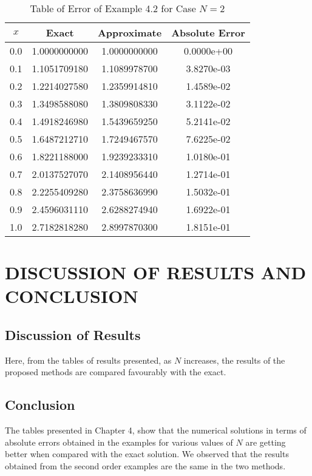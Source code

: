 \documentclass[12pt]{report}
\begin{document}
	\begin{table}[!hbt]
		\caption{Table of Error of Example 4.2 for Case $N=2$}
		\begin{center}
			\begin{tabular}{|c||c||c||c||}
				\hline
				$x$ & Exact & Approximate & Absolute Error\\ \hline
				0.0 & 1.0000000000 & 1.0000000000 & 0.0000e+00\\ \hline
				0.1 & 1.1051709180 & 1.1089978700 & 3.8270e-03\\ \hline
				0.2 & 1.2214027580 & 1.2359914810 & 1.4589e-02\\ \hline
				0.3 & 1.3498588080 & 1.3809808330 & 3.1122e-02\\ \hline
				0.4 & 1.4918246980 & 1.5439659250 & 5.2141e-02\\ \hline
				0.5 & 1.6487212710 & 1.7249467570 & 7.6225e-02\\ \hline
				0.6 & 1.8221188000 & 1.9239233310 & 1.0180e-01\\ \hline
				0.7 & 2.0137527070 & 2.1408956440 & 1.2714e-01\\ \hline
				0.8 & 2.2255409280 & 2.3758636990 & 1.5032e-01\\ \hline
				0.9 & 2.4596031110 & 2.6288274940 & 1.6922e-01\\ \hline
				1.0 & 2.7182818280 & 2.8997870300 & 1.8151e-01\\ \hline
			\end{tabular}
		\end{center}
		\label{tb:4_6}
	\end{table}	
	

	
	\chapter{DISCUSSION OF RESULTS AND CONCLUSION}
	
	\section{Discussion of Results}
	Here, from the tables of results presented, as $N$ increases, the results of the proposed methods are compared favourably with the exact.
	
	\section{Conclusion}
	The tables presented in Chapter 4, show that the numerical solutions in terms of absolute errors obtained in the examples for various values of $N$ are getting better when compared with the exact solution. We observed that the results obtained from the second order examples are the same in the two methods.
	
\end{document}
